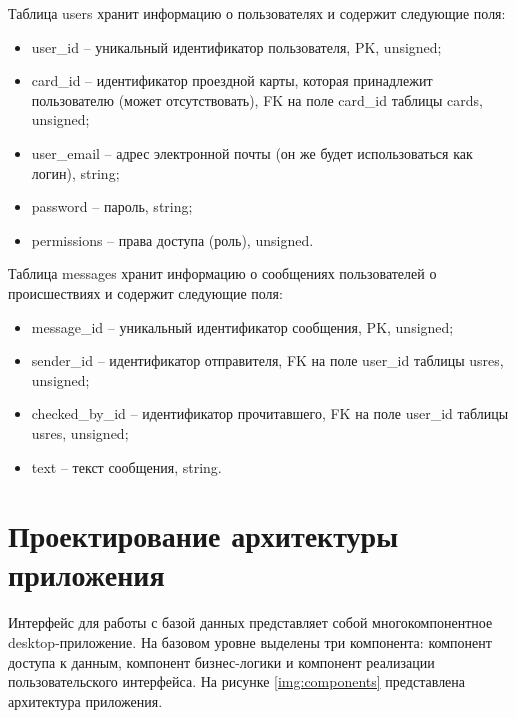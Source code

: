 Таблица users хранит информацию о пользователях и содержит следующие поля:
\begin{itemize}
	\item user\_id -- уникальный идентификатор пользователя, PK, unsigned;
	\item card\_id -- идентификатор проездной карты, которая принадлежит пользователю (может отсутствовать), FK на поле card\_id таблицы cards, unsigned;
	\item user\_email -- адрес электронной почты (он же будет использоваться как логин), string;
	\item password -- пароль, string;
	\item permissions -- права доступа (роль), unsigned.
\end{itemize}


Таблица messages хранит информацию о сообщениях пользователей о происшествиях и содержит следующие поля:
\begin{itemize}
	\item message\_id -- уникальный идентификатор сообщения, PK, unsigned;
	\item sender\_id -- идентификатор отправителя, FK на поле user\_id таблицы usres, unsigned;
	\item checked\_by\_id -- идентификатор прочитавшего, FK на поле user\_id таблицы usres, unsigned;
	\item text -- текст сообщения, string.	
\end{itemize}


\section{Проектирование архитектуры приложения}

Интерфейс для работы с базой данных представляет собой  многокомпонентное desktop-приложение. На базовом уровне выделены три компонента: компонент доступа к данным, компонент бизнес-логики и компонент реализации пользовательского интерфейса. На рисунке \ref{img:components} представлена архитектура приложения.

